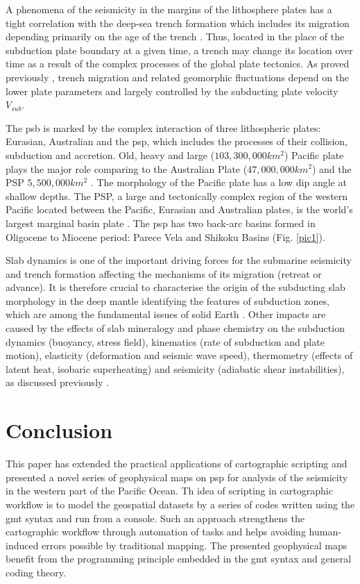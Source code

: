 \documentclass{rrparticle}
\begin{document}
A phenomena of the seismicity in the margins of the lithosphere plates has a tight correlation with the deep-sea trench formation which includes its migration depending primarily on the age of the trench \cite{Faccenna,Gutscher}. Thus, located in the place of the subduction plate boundary at a given time, a trench may change its location over time as a result of the complex processes of the global plate tectonics. As proved previously \cite{Lallemand}, trench migration and related geomorphic fluctuations depend on the lower plate parameters and largely controlled by the subducting plate velocity $V_{sub}$.
	
The \ac{psb} is marked by the complex interaction of three lithospheric plates: Eurasian, Australian and the \ac{psp}, which includes the processes of their collision, subduction and accretion. Old, heavy and large ($103,300,000 km^2$) Pacific plate plays the major role comparing to the Australian Plate ($47,000,000 km^2$) and the PSP $5,500,000 km^2$ \cite{Alden}. The morphology of the Pacific plate has a low dip angle at shallow depths. The PSP, a large and tectonically complex region of the western Pacific located between the Pacific, Eurasian and Australian plates, is the world’s largest marginal basin plate \cite{Sdrolias}. The \ac{psp} has two back-arc basins formed in Oligocene to Miocene period: Parece Vela and Shikoku Basins (Fig. \ref{pic1}). 

Slab dynamics is one of the important driving forces for the submarine seismicity and trench formation affecting the mechanisms of its migration (retreat or advance). It is therefore crucial to characterise the origin of the subducting slab morphology in the deep mantle identifying the features of subduction zones, which are among the fundamental issues of solid Earth \cite{Yoshida}. Other impacts are caused by the effects of slab mineralogy and phase chemistry on the subduction dynamics (buoyancy, stress field), kinematics (rate of subduction and plate motion), elasticity (deformation and seismic wave speed), thermometry (effects of latent heat, isobaric superheating) and seismicity (adiabatic shear instabilities), as discussed previously \cite{Bina}. 

\section{Conclusion}

This paper has extended the practical applications of cartographic scripting and presented a novel series of geophysical maps on \ac{psp} for analysis of the seismicity in the western part of the Pacific Ocean. Th idea of scripting in cartographic workflow is to model the geospatial datasets by a series of codes written using the \ac{gmt} syntax and run from a console. Such an approach strengthens the cartographic workflow through automation of tasks and helps avoiding human-induced errors possible by traditional mapping. The presented geophysical maps benefit from the programming principle embedded in the \ac{gmt} syntax and general coding theory. 
\end{document}
